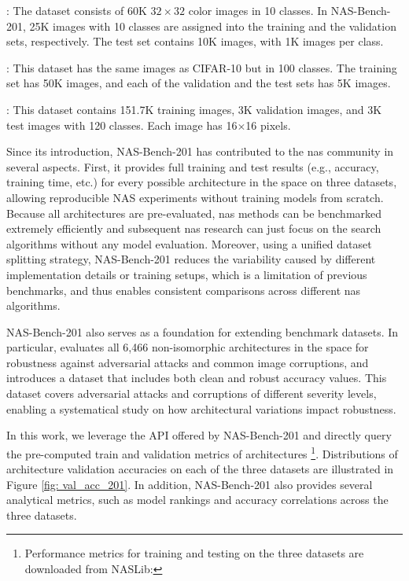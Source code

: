 \documentclass[a4paper,oneside,bibliography=totoc]{scrbook}
\begin{document}
\begin{description}[leftmargin=0cm, listparindent=\parindent]
 	\item[CIFAR10]:	The dataset consists of 60K $32\times32$ color images in 10 classes. In NAS-Bench-201, 25K images with 10 classes are assigned into the training and the validation sets, respectively. The test set contains 10K images, with 1K images per class.
 	\item[CIFAR100]: This dataset has the same images as CIFAR-10 but in 100 classes. The training set has 50K images, and each of the validation and the test sets has 5K images.
 	\item[ImageNet16-120]: This dataset contains 151.7K training images, 3K validation images, and 3K test images with 120 classes. Each image has 16$\times$16 pixels.
\end{description} 


Since its introduction, NAS-Bench-201 has contributed to the \gls{nas} community in several aspects. First, it provides full training and test results (e.g., accuracy, training time, etc.) for every possible architecture in the space on three datasets, allowing reproducible NAS experiments without training models from scratch. Because all architectures are pre-evaluated, \gls{nas} methods can be benchmarked extremely efficiently and subsequent \gls{nas} research can just focus on the search algorithms without any model evaluation. Moreover, using a unified dataset splitting strategy, NAS-Bench-201 reduces the variability caused by different implementation details or training setups, which is a limitation of previous benchmarks, and thus enables consistent comparisons across different \gls{nas} algorithms. 

\vspace{0.2em}	
NAS-Bench-201 also serves as a foundation for extending benchmark datasets. In particular, \cite{jung2023neural} evaluates all 6,466 non-isomorphic architectures in the space for robustness against adversarial attacks and common image corruptions, and introduces a dataset that includes both clean and robust accuracy values. This dataset covers adversarial attacks and corruptions of different severity levels, enabling a systematical study on how architectural variations impact robustness.

\vspace{0.2em}
In this work, we leverage the API offered by NAS-Bench-201 and directly query the pre-computed train and validation metrics of architectures \footnote{Performance metrics for training and testing on the three datasets are downloaded from NASLib: }. Distributions of architecture validation accuracies on each of the three datasets are illustrated in Figure \ref{fig: val_acc_201}. In addition, NAS-Bench-201 also provides several analytical metrics, such as model rankings and accuracy correlations across the three datasets.
\end{document}
